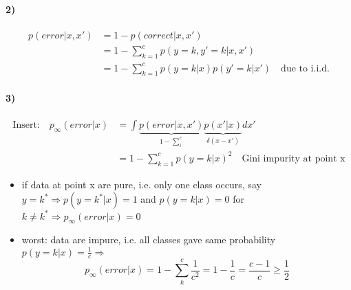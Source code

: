 \documentclass[11pt]{article}
\begin{document}
        \paragraph{2)}
          \begin{equation*}
            \begin{align}
              p(error|x,x') &= 1-p(correct|x,x') \\
              &= 1-\sum_{k=1}^{c}p(y=k,y'=k|x,x') \\
              &= 1-\sum_{k=1}^{c}p(y=k|x)p(y'=k|x') \quad \text{due to i.i.d.}
            \end{align}
          \end{equation*}
        \paragraph{3)}
          \begin{equation*}
            \begin{align*}
              \text{Insert:} \quad p_{\infty}(error|x) &= \int \underbrace{
              p(error|x,x')}_{1-\sum_{i}^{c}}\underbrace{p(x'|x)}_{\delta(x-x')}dx' \\
              &= 1- \sum_{k=1}^{c}p(y=k|x)^2 \quad \text{Gini impurity at point x}
            \end{align*}
          \end{equation*}
          \begin{itemize}
            \item if data at point x are pure, i.e. only one class occurs,
            say $y=k^* \Rightarrow p(y=k^*|x)=1$ and $p(y=k|x)=0$ for $k\neq k^*
            \Rightarrow p_{\infty}(error|x) = 0$
            \item worst: data are impure, i.e. all classes gave same probability
            $p(y=k|x) = \frac{1}{c} \Rightarrow$
            \begin{equation*}
              p_{\infty}(error|x)=1-\sum_{k}^{c} \frac{1}{c^2} = 1-\frac{1}{c}
              = \frac{c-1}{c} \geq \frac{1}{2}
            \end{equation*}
          \end{itemize}
\end{document}
